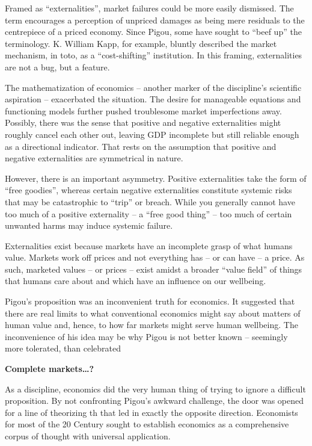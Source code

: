 \documentclass[
]{book}
\begin{document}
Framed as ``externalities'', market failures could be more easily dismissed.
The term encourages a perception of unpriced damages as
being mere residuals to the centrepiece of a priced economy.
Since Pigou, some have sought to ``beef up'' the terminology.
K. William Kapp, for example, bluntly described the market mechanism, in toto,
as a ``cost-shifting'' institution.
In this framing, externalities are not a bug, but a feature.

The mathematization of economics -- another marker of the discipline's
scientific aspiration -- exacerbated the situation.
The desire for manageable equations and functioning models
further pushed troublesome market imperfections away.
Possibly, there was the sense that positive and negative externalities
might roughly cancel each other out, leaving GDP incomplete
but still reliable enough as a directional indicator.
That rests on the assumption that positive and negative externalities are
symmetrical in nature.

However, there is an important asymmetry.
Positive externalities take the form of ``free goodies'', whereas certain negative externalities constitute systemic risks that
may be catastrophic to ``trip'' or breach. While you generally cannot have too much of a
positive externality -- a ``free good thing'' -- too much of certain unwanted harms may induce
systemic failure.

Externalities exist because markets have an incomplete grasp of what humans value. Markets
work off prices and not everything has -- or can have -- a price. As such, marketed values -- or
prices -- exist amidst a broader ``value field'' of things that humans care about and which have
an influence on our wellbeing.

Pigou's proposition was an inconvenient truth for economics. It suggested that there are real
limits to what conventional economics might say about matters of human value and, hence, to
how far markets might serve human wellbeing. The inconvenience of his idea may be why
Pigou is not better known -- seemingly more tolerated, than celebrated

\textbf{Complete markets\ldots?}

As a discipline, economics did the very human thing of trying to ignore a difficult proposition.
By not confronting Pigou's awkward challenge, the door was opened for a line of theorizing
th
that led in exactly the opposite direction. Economists for most of the 20 Century sought to
establish economics as a comprehensive corpus of thought with universal application.
\end{document}

